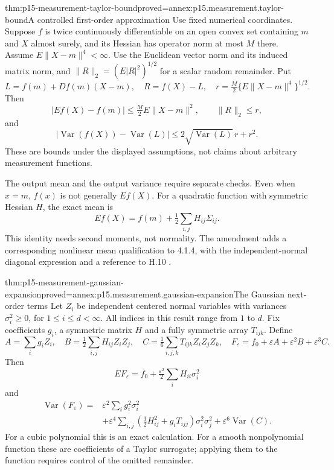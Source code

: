 \begin{hbtheorem}{thm:p15-measurement-taylor-bound}{proved=annex:p15.measurement.taylor-bound}{A controlled first-order approximation}
Use fixed numerical coordinates. Suppose \(f\) is twice continuously
differentiable on an open convex set containing \(m\) and \(X\) almost surely,
and its Hessian has operator norm at most \(M\) there. Assume
\(E\|X-m\|^4<\infty\). Use the Euclidean vector norm and its induced
matrix norm, and \(\|R\|_2=(E|R|^2)^{1/2}\) for a scalar random remainder. Put
\[
 L=f(m)+Df(m)(X-m),\quad R=f(X)-L,\quad
 r=\tfrac M2\{E\|X-m\|^4\}^{1/2}.
\]
Then
\[
 |Ef(X)-f(m)|\leq \tfrac M2 E\|X-m\|^2,\qquad
 \|R\|_2\leq r,
\]
and
\[
 \left|\operatorname{Var}(f(X))-\operatorname{Var}(L)\right|
 \leq2\sqrt{\operatorname{Var}(L)}\,r+r^2.
\]
These are bounds under the displayed assumptions, not claims about arbitrary
measurement functions.
\end{hbtheorem}

The output mean and the output variance require separate checks.
Even when \(x=m\), \(f(x)\) is not generally \(Ef(X)\). For a quadratic
function with symmetric Hessian \(H\), the exact mean is
\[
 Ef(X)=f(m)+\tfrac12\sum_{i,j}H_{ij}\Sigma_{ij}.
\]
This identity needs second moments, not normality.
The amendment adds a corresponding nonlinear mean qualification to 4.1.4,
with the independent-normal diagonal expression and a reference to H.10
\cite{JCGM100Amendment2026Nonlinearity}.

\begin{hbtheorem}{thm:p15-measurement-gaussian-expansion}{proved=annex:p15.measurement.gaussian-expansion}{The Gaussian next-order terms}
Let \(Z_i\) be independent centered normal variables with variances
\(\sigma_i^2\geq0\), for \(1\leq i\leq d<\infty\).
All indices in this result range from \(1\) to \(d\).
Fix coefficients \(g_i\), a symmetric matrix \(H\)
and a fully symmetric array \(T_{ijk}\). Define
\[
 A=\sum_i g_iZ_i,\quad B=\tfrac12\sum_{i,j}H_{ij}Z_iZ_j,\quad
 C=\tfrac16\sum_{i,j,k}T_{ijk}Z_iZ_jZ_k,\quad
 F_\varepsilon=f_0+\varepsilon A+\varepsilon^2B+\varepsilon^3C.
\]
Then
\[
 EF_\varepsilon=f_0+\tfrac{\varepsilon^2}2\sum_iH_{ii}\sigma_i^2
\]
and
\[
\begin{split}
 \operatorname{Var}(F_\varepsilon)
  ={}&\varepsilon^2\sum_i g_i^2\sigma_i^2\\
    &+\varepsilon^4\sum_{i,j}
       \left(\tfrac12H_{ij}^2+g_iT_{ijj}\right)\sigma_i^2\sigma_j^2
      +\varepsilon^6\operatorname{Var}(C).
\end{split}
\]
For a cubic polynomial this is an exact calculation.
For a smooth nonpolynomial function these are coefficients of a Taylor
surrogate; applying them to the function requires control of the omitted
remainder.
\end{hbtheorem}

